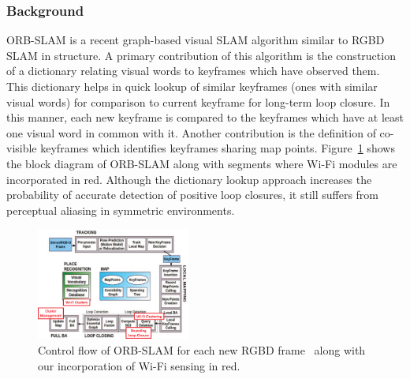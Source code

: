 \subsubsection{\textbf{Background}}
ORB-SLAM is a recent graph-based visual SLAM algorithm similar to RGBD SLAM in structure. A primary contribution of this algorithm is the construction of a dictionary relating visual words to keyframes which have observed them. This dictionary helps in quick lookup of similar keyframes (ones with similar visual words) for comparison to current keyframe for long-term loop closure. In this manner, each new keyframe is compared to the keyframes which have at least one visual word in common with it.
Another contribution is the definition of co-visible keyframes which identifies keyframes sharing map points. Figure~\ref{fig:orbslam_flowchart} shows the block diagram of ORB-SLAM along with segments where Wi-Fi modules are incorporated in red. 
Although the dictionary lookup approach increases the probability of accurate detection of positive loop closures, it still suffers from perceptual aliasing in symmetric environments.
\begin{figure}
\centering
\includegraphics[width=0.45\textwidth]{Figure5.eps}
    \caption{Control flow of ORB-SLAM for each new RGBD frame~\cite{orbslam} along with our incorporation of Wi-Fi sensing in red.}
\label{fig:orbslam_flowchart}
\vspace{-15pt}
\end{figure}
